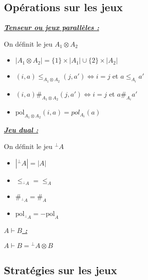 \documentclass[a4paper,12ptCOUCOU
]{article}
\newlength{\mydepth}
\newlength{\myheight}
\newenvironment{answer}
{\par\begin{lrbox}{\mybox}\quad\begin{minipage}{\linewidth}\color{black}\setlength{\parskip}{10pt plus 1pt minus 1pt}\vspace*{-.7\baselineskip}}
{\end{minipage}\end{lrbox}
\settodepth{\mydepth}{\usebox{\mybox}}
\settoheight{\myheight}{\usebox{\mybox}}
\addtolength{\myheight}{\mydepth}
\noindent\makebox[0pt]{
  \color{gray}\hspace{-0pt}\rule[-\mydepth]{1pt}{\myheight}}
\usebox{\mybox}
  }
\begin{document}
\subsection{Opérations sur les jeux}

\begin{samepage}\textbf{\textit{\underline{ Tenseur ou jeux parallèles : }}} \begin{answer}
On définit le jeu $A_1 \otimes A_2$
\begin{itemize}
\item $|A_1 \otimes A_2| = \{1\} \times |A_1| \cup \{2\} \times |A_2|$
\item $(i,a) \leq_{A_1 \otimes A_2} (j, a') \iff i = j $ et $a \leq_{A_i} a'$
\item $(i,a) \#_{A_1 \otimes A_2} (j,a') \iff i = j$ et $a \#_{A_i} a'$
\item $\text{pol}_{A_1 \otimes A_2}(i,a) = pol_{A_i} (a)$
\end{itemize}
\end{answer}\end{samepage}

\begin{samepage}\textbf{\textit{\underline{ Jeu dual : }}} \begin{answer}
On définit le jeu ${}^\bot A$
\begin{itemize}
\item $|{}^\bot A| = |A|$
\item $\leq_{{}^\bot A} = \leq_A$
\item $\#_{{}^\bot A} = \#_A$
\item $\text{pol}_{{}^\bot A} = - \text{pol}_A$
\end{itemize}
\end{answer}\end{samepage}

\begin{samepage}\textbf{\textit{\underline{ $A \vdash B$ : }}} \begin{answer}
$A \vdash B = {}^\bot A \otimes B$
\end{answer}\end{samepage}

\subsection{Stratégies sur les jeux}
\end{document}
